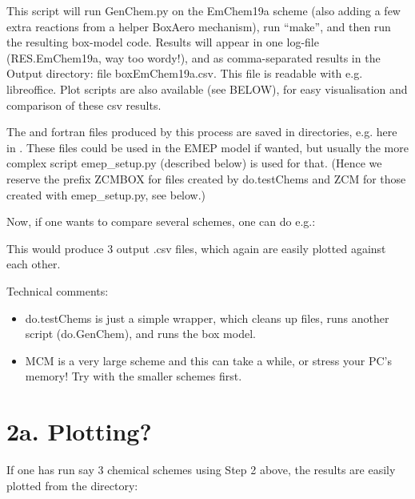 \documentclass[a4paper,10pt,english]{sphinxmanual}
\begin{document}
This script will run GenChem.py on the EmChem19a scheme (also adding
a few extra reactions from a helper BoxAero mechanism), run “make”, and then
run the resulting box-model code. Results will appear in
one log-file (RES.EmChem19a, way too wordy!), and as comma-separated
results in the Output directory:  file boxEmChem19a.csv.
This file is readable with e.g. libreoffice. Plot scripts are
also available (see BELOW), for easy visualisation and
comparison of these csv results.

The  and  fortran files produced by this process are saved in directories, e.g.
here in  . These files could be used in the EMEP model if wanted,
but usually the more complex script emep\_setup.py (described below) is
used for that. (Hence we reserve the prefix ZCMBOX for files created by do.testChems
and ZCM for those created with emep\_setup.py, see below.)

Now, if one wants to compare several schemes, one can do e.g.:

\begin{sphinxVerbatim}[commandchars=\\\{\}]
    
\end{sphinxVerbatim}

This would produce 3 output .csv files, which again are easily plotted
against each other.

Technical comments:
\begin{itemize}
\item {} 
do.testChems is just a simple wrapper, which cleans up files, runs another script (do.GenChem), and runs the box model.

\item {} 
MCM is a very large scheme and this can take a while, or stress your PC’s memory! Try with the smaller schemes first.

\end{itemize}


\section{2a. Plotting?}
\label{\detokenize{GenChemDoc_quickstart:a-plotting}}
If one has run say 3 chemical schemes using Step 2 above, the results
are easily plotted from the  directory:
\end{document}
